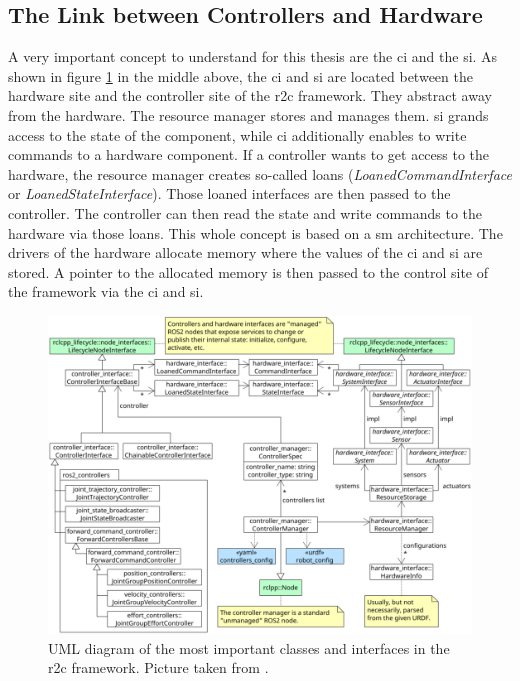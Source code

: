 \subsection{The Link between Controllers and Hardware}\label{c3_sec_link_ctrl_hw}
A very important concept to understand for this thesis are the \gls{ci} and the \gls{si}. As shown in figure \ref{c3_fig_ros2_control_uml} in the middle above, the \gls{ci} and \gls{si} are located between the hardware site and the controller site of the \gls{r2c} framework. They abstract away from the hardware. The resource manager stores and manages them. \gls{si} grands access to the state of the component, while \gls{ci} additionally enables to write commands to a hardware component. If a controller wants to get access to the hardware, the resource manager creates so-called loans (\textit{LoanedCommandInterface} or \textit{LoanedStateInterface}). Those loaned interfaces are then passed to the controller. The controller can then read the state and write commands to the hardware via those loans.\newline
This whole concept is based on a \gls{sm} architecture. The drivers of the hardware allocate memory where the values of the \gls{ci} and \gls{si} are stored. A pointer to the allocated memory is then passed to the control site of the framework via the \gls{ci} and \gls{si}.
\begin{figure}[htbp]
	\centering
	\includegraphics[width=1\textwidth]{Figures/c3/ros2_control_uml.png}
	\caption{UML diagram of the most important classes and interfaces in the \gls{r2c} framework. Picture taken from \cite{noauthor_welcome_nodate}. }
	\label{c3_fig_ros2_control_uml}
\end{figure}
 
